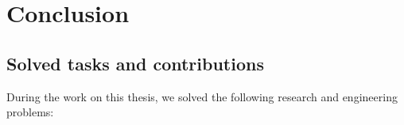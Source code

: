 \chapter{Conclusion}
\label{ch:summary}


\section{Solved tasks and contributions}

During the work on this thesis, we solved the following research and engineering problems:


